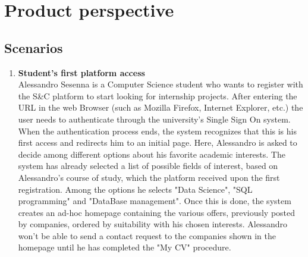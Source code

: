 \section{Product perspective}
\subsection{Scenarios}

\begin{enumerate}
      \item \textbf{Student's first platform access}\\
      Alessandro Sesenna is a Computer Science student who wants to register with the S\&C platform to start looking for internship projects. After entering the URL in the web Browser (such as Mozilla Firefox, Internet Explorer, etc.) the user needs to authenticate through the university's Single Sign On system. When the authentication process ends, the system recognizes that this is his first access and redirects him to an initial page. 
      Here, Alessandro is asked to decide among different options about his favorite academic interests. The system has already selected a list of possible fields of interest, based on Alessandro's course of study, which the platform received upon the first registration. Among the options he selects "Data Science", "SQL programming" and "DataBase management". Once this is done, the system creates an ad-hoc homepage containing the various offers, previously posted by companies, ordered by suitability with his chosen interests. Alessandro won't be able to send a contact request to the companies shown in the homepage until he has completed the "My CV" procedure.


\end{enumerate}
